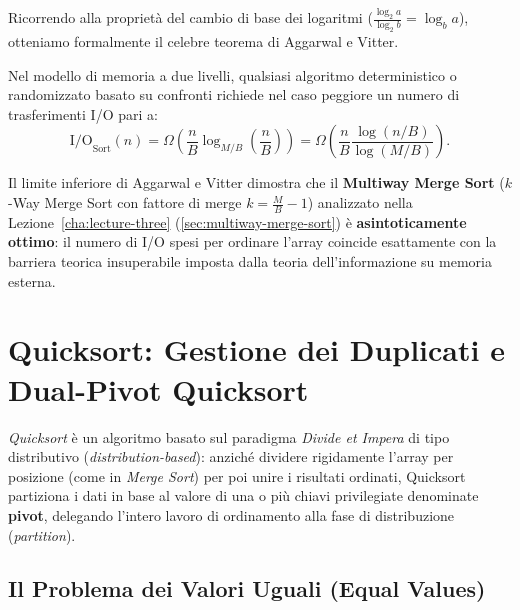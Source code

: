 Ricorrendo alla proprietà del cambio di base dei logaritmi ($\frac{\log_2 a}{\log_2 b} = \log_b a$), otteniamo formalmente il celebre teorema di Aggarwal e Vitter.

\begin{theorem}
\label{thm:aggarwal-vitter-bound}
Nel modello di memoria a due livelli, qualsiasi algoritmo deterministico o randomizzato basato su confronti richiede nel caso peggiore un numero di trasferimenti I/O pari a:
\begin{equation}
  \text{I/O}_{\text{Sort}}(n) = \Omega\left(\frac{n}{B} \log_{M/B}\left(\frac{n}{B}\right)\right) = \Omega\left(\frac{n}{B} \frac{\log(n / B)}{\log(M / B)}\right).
\end{equation}
\end{theorem}

\begin{property}
Il limite inferiore di Aggarwal e Vitter dimostra che il \textbf{Multiway Merge Sort} ($k$-Way Merge Sort con fattore di merge $k = \frac{M}{B} - 1$) analizzato nella Lezione~\ref{cha:lecture-three} (\autoref{sec:multiway-merge-sort}) è \textbf{asintoticamente ottimo}: il numero di I/O spesi per ordinare l'array coincide esattamente con la barriera teorica insuperabile imposta dalla teoria dell'informazione su memoria esterna.
\end{property}

\FloatBarrier
\section{Quicksort: Gestione dei Duplicati e Dual-Pivot Quicksort}
\label{sec:quicksort-and-dual-pivot}

\textit{Quicksort} è un algoritmo basato sul paradigma \textit{Divide et Impera} di tipo distributivo (\textit{distribution-based}): anziché dividere rigidamente l'array per posizione (come in \textit{Merge Sort}) per poi unire i risultati ordinati, Quicksort partiziona i dati in base al valore di una o più chiavi privilegiate denominate \textbf{pivot}, delegando l'intero lavoro di ordinamento alla fase di distribuzione (\textit{partition}).

\subsection{Il Problema dei Valori Uguali (Equal Values)}
\label{subsec:equal-values-problem}

